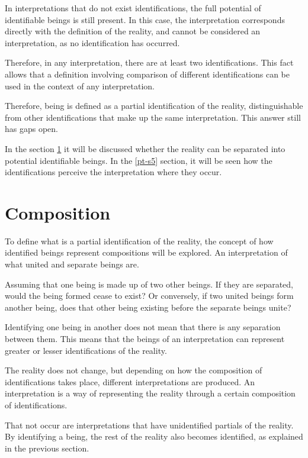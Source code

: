 \documentclass[11pt]{article}
\begin{document}
	In interpretations that do not exist identifications, the full potential of identifiable beings is still present. In this case, the interpretation corresponds directly with the definition of the reality, and cannot be considered an interpretation, as no identification has occurred.
	
	Therefore, in any interpretation, there are at least two identifications. This fact allows that a definition involving comparison of different identifications can be used in the context of any interpretation. 
	
	Therefore, being is defined as a partial identification of the reality, distinguishable from other identifications that make up the same interpretation. This answer still has gaps open.
	
	In the section \ref{pt-s4} it will be discussed whether the reality can be separated into potential identifiable beings. In the \ref{pt-s5} section, it will be seen how the identifications perceive the interpretation where they occur.
	
	\section{Composition} \label{pt-s4}
	
	To define what is a partial identification of the reality, the concept of how identified beings represent compositions will be explored. An interpretation of what united and separate beings are.
	
	Assuming that one being is made up of two other beings. If they are separated, would the being formed cease to exist? Or conversely, if two united beings form another being, does that other being existing before the separate beings unite? 
	
	Identifying one being in another does not mean that there is any separation between them. This means that the beings of an interpretation can represent greater or lesser identifications of the reality. 
	
	The reality does not change, but depending on how the composition of identifications takes place, different interpretations are produced. An interpretation is a way of representing the reality through a certain composition of identifications.
	
	That not occur are interpretations that have unidentified partials of the reality. By identifying a being, the rest of the reality also becomes identified, as explained in the previous section. 
	
\end{document}
